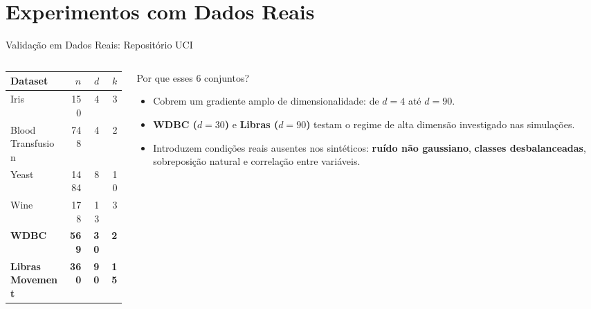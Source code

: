 \documentclass[aspectratio=169,11pt]{beamer}
\begin{document}
\section{Experimentos com Dados Reais}

\begin{frame}{Validação em Dados Reais: Repositório UCI}
  \begin{columns}[c]
    \begin{column}{0.48\textwidth}
      \begin{table}
        \centering
        \small
        \begin{tabular}{lrrr}
          \toprule
          Dataset & $n$ & $d$ & $k$ \\
          \midrule
          Iris              &  150 &  4 &  3 \\
          Blood Transfusion &  748 &  4 &  2 \\
          Yeast             & 1484 &  8 & 10 \\
          Wine              &  178 & 13 &  3 \\
          \textbf{WDBC}     &  \textbf{569} & \textbf{30} &  \textbf{2} \\
          \textbf{Libras Movement} & \textbf{360} & \textbf{90} & \textbf{15} \\
          \bottomrule
        \end{tabular}
      \end{table}
    \end{column}
    \begin{column}{0.49\textwidth}
      \begin{block}{Por que esses 6 conjuntos?}
        \small
        \begin{itemize}
          \item Cobrem um gradiente amplo de dimensionalidade: de $d = 4$ até
                $d = 90$.
          \item \textbf{WDBC ($d=30$)} e \textbf{Libras ($d=90$)} testam o
                regime de alta dimensão investigado nas simulações.
          \item Introduzem condições reais ausentes nos sintéticos: \textbf{ruído
                não gaussiano}, \textbf{classes desbalanceadas}, sobreposição
                natural e correlação entre variáveis.
        \end{itemize}
      \end{block}
    \end{column}
  \end{columns}
\end{frame}
\end{document}
